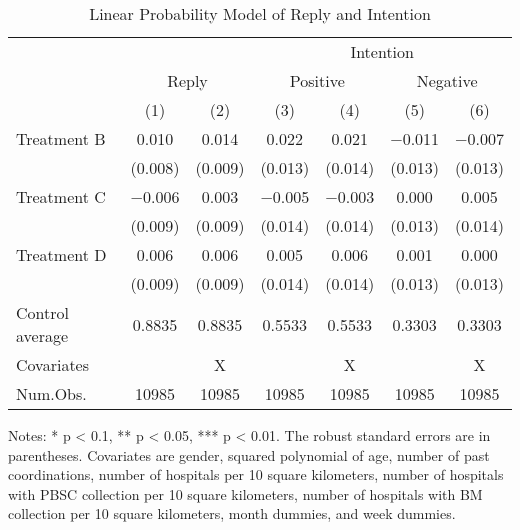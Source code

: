 \documentclass[
  lualatex,
  11pt,
  a4paper
]{article}
\begin{document}
\begin{table}

\caption{\label{tab:reg-stock}Linear Probability Model of Reply and Intention}
\centering
\fontsize{9}{11}\selectfont
\begin{threeparttable}
\begin{tabular}[t]{lcccccc}
\toprule
\multicolumn{3}{c}{ } & \multicolumn{4}{c}{Intention} \\
\cmidrule(l{3pt}r{3pt}){4-7}
\multicolumn{1}{c}{ } & \multicolumn{2}{c}{Reply} & \multicolumn{2}{c}{Positive} & \multicolumn{2}{c}{Negative} \\
\cmidrule(l{3pt}r{3pt}){2-3} \cmidrule(l{3pt}r{3pt}){4-5} \cmidrule(l{3pt}r{3pt}){6-7}
  & (1) & (2) & (3) & (4) & (5) & (6)\\
\midrule
Treatment B & \num{0.010} & \num{0.014} & \num{0.022} & \num{0.021} & \num{-0.011} & \num{-0.007}\\
 & (\num{0.008}) & (\num{0.009}) & (\num{0.013}) & (\num{0.014}) & (\num{0.013}) & (\num{0.013})\\
Treatment C & \num{-0.006} & \num{0.003} & \num{-0.005} & \num{-0.003} & \num{0.000} & \num{0.005}\\
 & (\num{0.009}) & (\num{0.009}) & (\num{0.014}) & (\num{0.014}) & (\num{0.013}) & (\num{0.014})\\
Treatment D & \num{0.006} & \num{0.006} & \num{0.005} & \num{0.006} & \num{0.001} & \num{0.000}\\
 & (\num{0.009}) & (\num{0.009}) & (\num{0.014}) & (\num{0.014}) & (\num{0.013}) & (\num{0.013})\\
\midrule
Control average & 0.8835 & 0.8835 & 0.5533 & 0.5533 & 0.3303 & 0.3303\\
Covariates &  & X &  & X &  & X\\
Num.Obs. & \num{10985} & \num{10985} & \num{10985} & \num{10985} & \num{10985} & \num{10985}\\
\bottomrule
\end{tabular}
\begin{tablenotes}
\item Notes: * p < 0.1, ** p < 0.05, *** p < 0.01. The robust standard errors are in parentheses. Covariates are gender, squared polynomial of age, number of past coordinations, number of hospitals per 10 square kilometers, number of hospitals with PBSC collection per 10 square kilometers, number of hospitals with BM collection per 10 square kilometers, month dummies, and week dummies.
\end{tablenotes}
\end{threeparttable}
\end{table}
\end{document}
